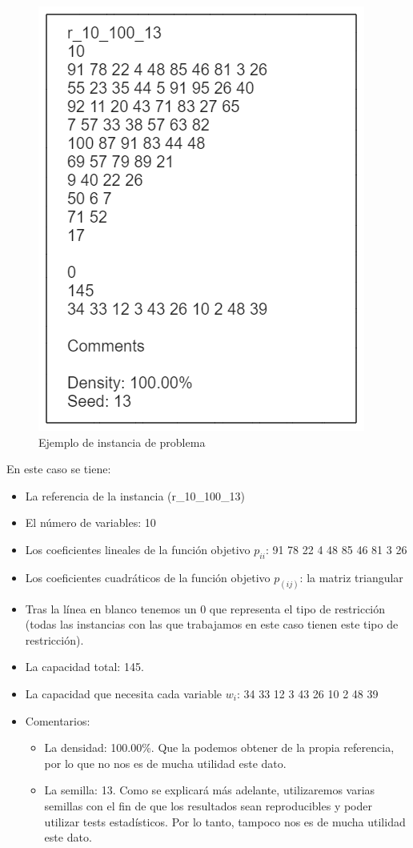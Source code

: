 \begin{figure}[H]
		\centering
		\includegraphics[scale=0.5]{imagenes/ejemploInstancia.png}
        \caption{Ejemplo de instancia de problema}
        \label{fig:ejemploInstancia}
\end{figure}

En este caso se tiene:
\begin{itemize}
	\item La referencia de la instancia (r\_10\_100\_13)
	\item El número de variables: 10
	\item Los coeficientes lineales de la función objetivo $p_{ii}$: 91 78 22 4 48 85 46 81 3 26
	\item Los coeficientes cuadráticos de la función objetivo $p_(ij)$: la matriz triangular
	\item Tras la línea en blanco tenemos un 0 que representa el tipo de restricción (todas las instancias con las que trabajamos en este caso tienen este tipo de restricción). 
	\item La capacidad total: 145.
	\item La capacidad que necesita cada variable $w_i$: 34 33 12 3 43 26 10 2 48 39
	\item Comentarios:
	\begin{itemize}
		\item La densidad: 100.00\%. Que la podemos obtener de la propia referencia, por lo que no nos es de mucha utilidad este dato. 
		\item La semilla: 13. Como se explicará más adelante, utilizaremos varias semillas con el fin de que los resultados sean reproducibles y poder utilizar tests estadísticos. Por lo tanto, tampoco nos es de mucha utilidad este dato. 
	\end{itemize}
\end{itemize}

